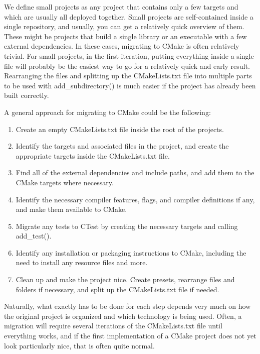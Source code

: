 We define small projects as any project that contains only a few targets and which are usually all deployed together. Small projects are self-contained inside a single repository, and usually, you can get a relatively quick overview of them. These might be projects that build a single library or an executable with a few external dependencies. In these cases, migrating to CMake is often relatively trivial. For small projects, in the first iteration, putting everything inside a single file will probably be the easiest way to go for a relatively quick and early result. Rearranging the files and splitting up the CMakeLists.txt file into multiple parts to be used with add\_subdirectory() is much easier if the project has already been built correctly.

A general approach for migrating to CMake could be the following:

\begin{enumerate}
\item 
Create an empty CMakeLists.txt file inside the root of the projects.

\item 
Identify the targets and associated files in the project, and create the appropriate targets inside the CMakeLists.txt file.

\item 
Find all of the external dependencies and include paths, and add them to the CMake targets where necessary.

\item 
Identify the necessary compiler features, flags, and compiler definitions if any, and make them available to CMake.

\item 
Migrate any tests to CTest by creating the necessary targets and calling add\_test().

\item 
Identify any installation or packaging instructions to CMake, including the need to install any resource files and more.

\item 
Clean up and make the project nice. Create presets, rearrange files and folders if necessary, and split up the CMakeLists.txt file if needed.
\end{enumerate}

Naturally, what exactly has to be done for each step depends very much on how the original project is organized and which technology is being used. Often, a migration will require several iterations of the CMakeLists.txt file until everything works, and if the first implementation of a CMake project does not yet look particularly nice, that is often quite normal.

